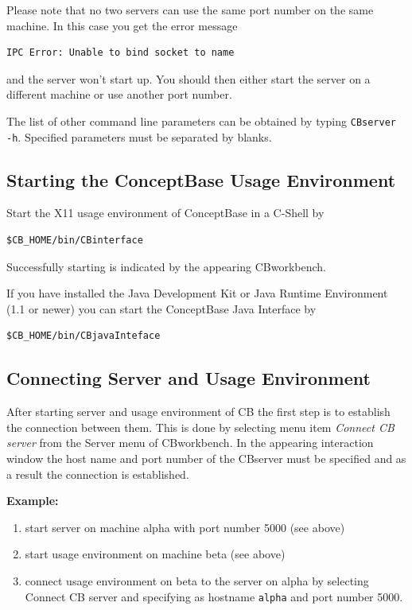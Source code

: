 Please note that no two servers can use the same port number on the same
machine. In this case you get the error message

\begin{verbatim}
IPC Error: Unable to bind socket to name
\end{verbatim}

and the server won't start up. You should then either start the server on a
different machine or use another port number.

The list of other command line parameters can be obtained by
typing \verb+CBserver -h+. Specified parameters must be separated by blanks.



\subsection{Starting the ConceptBase Usage Environment}

Start the X11 usage environment of ConceptBase in a C-Shell by

\begin{verbatim}
$CB_HOME/bin/CBinterface
\end{verbatim}

Successfully starting is indicated by the appearing CBworkbench.

If you have installed the Java Development Kit or Java Runtime
Environment (1.1 or newer) you can start the ConceptBase Java
Interface by

\begin{verbatim}
$CB_HOME/bin/CBjavaInteface
\end{verbatim}

\subsection{Connecting Server and Usage Environment}

After starting server and usage environment of CB the first step is to
establish the connection between them. This is done by selecting menu item
{\em Connect CB server}
from the Server  menu of CBworkbench. In the appearing interaction window the
host name and port number of the CBserver must be specified and as a result
the connection is established.

\begin{flushleft}
{\bf Example:}
\end{flushleft}
\begin{enumerate}
\item start server on machine alpha with port number 5000 (see above)
\item start usage environment on machine beta (see above)
\item connect usage environment on beta to the server on alpha
              	by selecting Connect CB server and specifying
				as hostname \verb+alpha+ and port number 5000.
\end{enumerate}

